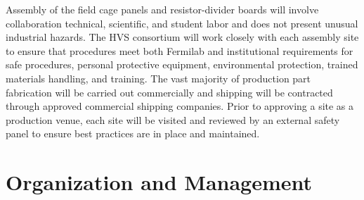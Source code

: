 Assembly of the field cage panels and resistor-divider boards will involve collaboration technical, scientific, and student labor and  does not present unusual industrial hazards. The HVS consortium will work closely with each assembly site to ensure that procedures meet both Fermilab and institutional requirements for safe procedures, personal protective equipment, environmental protection, trained materials handling, and training. The vast majority of production part fabrication will be carried out commercially and shipping will be contracted through approved commercial shipping companies. Prior to approving a site as a production venue, each site will be visited and reviewed by an external safety panel to ensure best practices are in place and maintained. 

%






\section{Organization and Management}
\label{sec:fdsp-hv-org}


